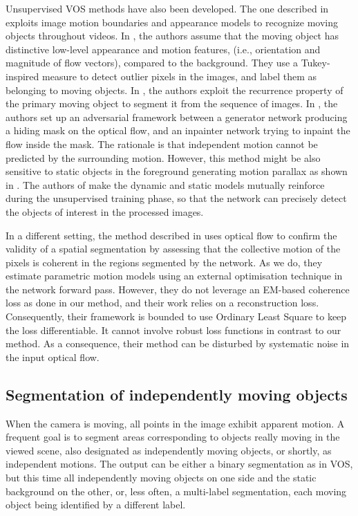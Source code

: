 \documentclass[10pt,twocolumn,letterpaper]{article}
\begin{document}
Unsupervised VOS methods have also been developed. The one described in \cite{papazoglou_fast_2013} exploits image motion boundaries and appearance models to recognize moving objects throughout videos. In \cite{griffin_tukey-inspired_2019}, the authors assume that the moving object has distinctive low-level appearance and motion features, (i.e., orientation and magnitude of flow vectors), compared to the background. They use a Tukey-inspired measure to detect outlier pixels in the images, and label them as belonging to moving objects. In \cite{arp}, the authors exploit the recurrence property of the primary moving object to segment it from the sequence of images. In \cite{yang_unsupervised_2019}, the authors set up an adversarial framework between a generator network producing a hiding mask on the optical flow, and an inpainter network trying to inpaint the flow inside the mask. The rationale is that independent motion cannot be predicted by the surrounding motion. However, this method might be also sensitive to static objects in the foreground generating motion parallax as shown in \cite{meunier2021}. The authors of \cite{dystab} make the dynamic and static models mutually reinforce during the unsupervised training phase, so that the network can precisely detect the objects of interest in the processed images. 

In a different setting, the method described in \cite{mahendran2018} uses optical flow to confirm the validity of a spatial segmentation by assessing that the collective motion of the pixels is coherent in the regions segmented by the network. As we do, they estimate parametric motion models using an external optimisation technique in the network forward pass. However, they do not leverage an EM-based coherence loss as done in our method, and their work relies on a reconstruction loss.
Consequently, their framework is bounded to use Ordinary Least Square to keep the loss differentiable. {\color{black} It cannot involve robust loss functions in contrast to our method.} As a consequence, their method can be disturbed by systematic noise in the input optical flow.

\subsection{Segmentation of independently moving objects}


When the camera is moving, all points in the image exhibit apparent motion. A frequent goal is to segment areas corresponding to objects really moving in the viewed scene, also designated as independently moving objects, or shortly, as independent motions. The output can be either a binary segmentation as in VOS, but this time all independently moving objects on one side and the static background on the other, or, less often, a multi-label segmentation, each moving object being identified by a different label.
\end{document}
